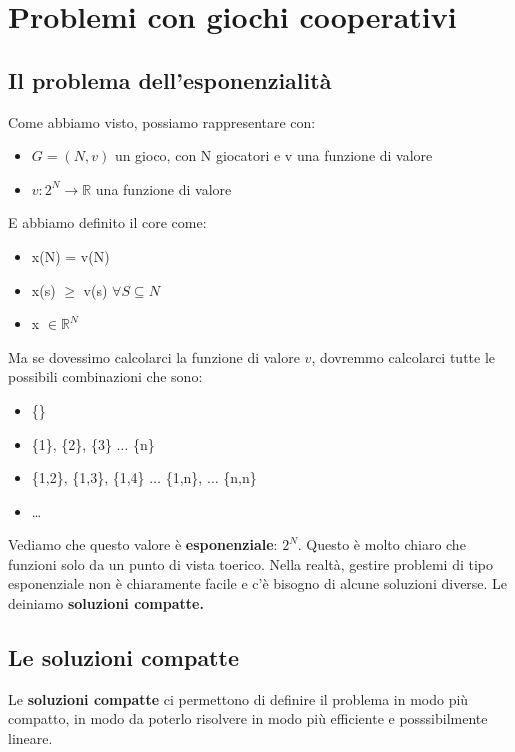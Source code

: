 \section{Problemi con giochi cooperativi}

\subsection{Il problema dell'esponenzialità}

Come abbiamo visto, possiamo rappresentare con:
\begin{itemize}
    \item $G = (N,v)$ un gioco, con N giocatori e v una funzione di valore
    \item $v: 2^N \rightarrow \mathbb{R}$ una funzione di valore
\end{itemize}

E abbiamo definito il core come:
\begin{itemize}
    \item x(N) = v(N)
    \item x(s) $\geq$ v(s) $\forall S \subseteq N$
    \item x $\in \mathbb{R}^N$
\end{itemize}

Ma se dovessimo calcolarci la funzione di valore $v$, dovremmo calcolarci tutte
le possibili combinazioni che sono:
\begin{itemize}
    \item \{\}
    \item \{1\}, \{2\}, \{3\} $\dots$ \{n\}
    \item \{1,2\}, \{1,3\}, \{1,4\} $\dots$ \{1,n\}, $\dots$ \{n,n\}
    \item \dots
\end{itemize}

Vediamo che questo valore è \textbf{esponenziale}: $2^N$. Questo è molto chiaro
che funzioni solo da un punto di vista toerico. Nella realtà, gestire problemi
di tipo esponenziale non è chiaramente facile e c'è bisogno di alcune soluzioni
diverse. Le deiniamo \textbf{soluzioni compatte.}

\subsection{Le soluzioni compatte}

Le \textbf{soluzioni compatte} ci permettono di definire il problema in modo
più compatto, in modo da poterlo risolvere in modo più efficiente e
posssibilmente lineare.

